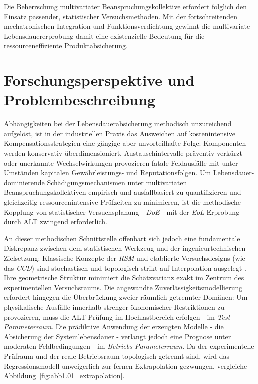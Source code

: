 Die Beherrschung multivariater Beanspruchungskollektive erfordert folglich den Einsatz passender, statistischer Versuchsmethoden.
Mit der fortschreitenden mechatronischen Integration und Funktionsverdichtung gewinnt die multivariate Lebensdauererprobung damit eine existenzielle Bedeutung für die ressourceneffiziente Produktabsicherung.

\section{Forschungsperspektive und Problembeschreibung} \label{sec:problembeschreibung}

 Abhängigkeiten bei der Lebensdauerabsicherung methodisch unzureichend aufgelöst, ist in der industriellen Praxis das Ausweichen auf kostenintensive Kompensationsstrategien eine gängige aber unvorteilhafte Folge:
Komponenten werden konservativ überdimensioniert, Austauschintervalle präventiv verkürzt oder unerkannte Wechselwirkungen provozieren fatale Feldausfälle mit unter Umständen kapitalen Gewährleistungs- und Reputationsfolgen.
Um Lebensdauer-dominierende Schädigungsmechanismen unter multivariaten Beanspruchungskollektiven empirisch und ausfallbasiert zu quantifizieren und gleichzeitig ressourcenintensive Prüfzeiten zu minimieren, ist die methodische Kopplung von statistischer Versuchsplanung - \textit{\ac{DoE}} - mit der \textit{\ac{EoL}}-Erprobung durch \ac{ALT} zwingend erforderlich.


An dieser methodischen Schnittstelle offenbart sich jedoch eine fundamentale Diskrepanz zwischen dem statistischen Werkzeug und der ingenieurtechnischen Zielsetzung:
Klassische Konzepte der \textit{\ac{RSM}} und etablierte Versuchsdesigns (wie das \textit{\ac{CCD}}) sind stochastisch und topologisch strikt auf Interpolation ausgelegt \cite{Rigdon.2022,Kremer.2021}.
Ihre geometrische Struktur minimiert die Schätzvarianz exakt im Zentrum des experimentellen Versuchsraums.
Die angewandte Zuverlässigkeitsmodellierung erfordert hingegen die Überbrückung zweier räumlich getrennter Domänen:
Um physikalische Ausfälle innerhalb strenger ökonomischer Restriktionen zu provozieren, muss die \ac{ALT}-Prüfung  im Hochlastbereich erfolgen - im \textit{Test-Parameterraum}.
Die prädiktive Anwendung der erzeugten Modelle - die Absicherung der Systemlebensdauer - verlangt jedoch eine Prognose unter moderaten Feldbedingungen - im \textit{Betriebs-Parameterraum}.
Da der experimentelle Prüfraum und der reale Betriebsraum topologisch getrennt sind, wird das Regressionsmodell unweigerlich zur fernen Extrapolation gezwungen, vergleiche Abbildung~\ref{fig:abb1.01_extrapolation}.

